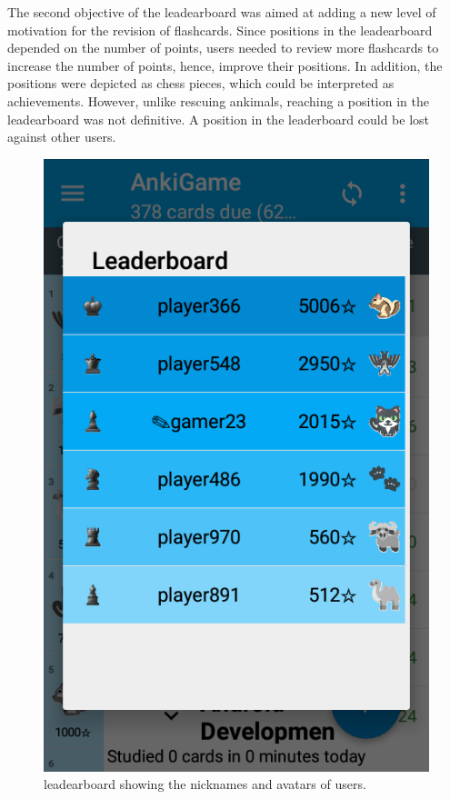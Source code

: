 The second objective of the leadearboard was aimed at adding a new level of motivation for the revision of flashcards. Since positions in the leadearboard depended on the number of points, users needed to review more flashcards to increase the number of points, hence, improve their positions. In addition, the positions were depicted as chess pieces, which could be interpreted as achievements. However, unlike rescuing ankimals, reaching a position in the leadearboard was not definitive. A position in the leaderboard could be lost against other users.

\begin{figure}[htb]
    \vskip 5mm
        \begin{center}
            \includegraphics[scale=0.4]{./Figures/leaderboard.png}
            \caption{leadearboard showing the nicknames and avatars of users.}
            \label{fig:leaderboard}
        \end{center}
    \vskip -5mm
\end{figure}

